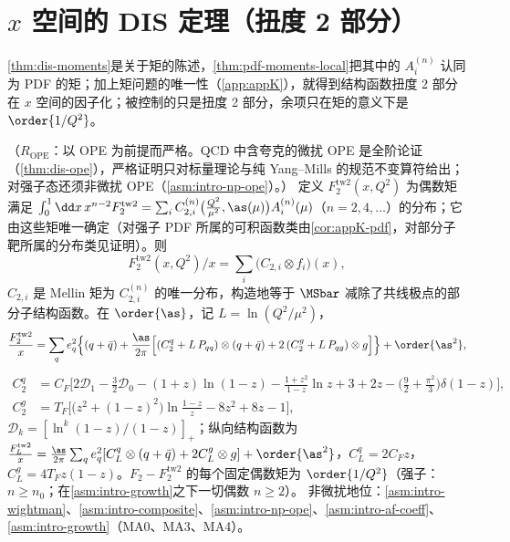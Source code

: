 \section{$x$ 空间的 DIS 定理（扭度 2 部分）}\label{sec:pdf-dis}

\cref{thm:dis-moments}是关于矩的陈述，\cref{thm:pdf-moments-local}把其中的 $A^{(n)}_i$ 认同为 PDF 的矩；加上矩问题的唯一性（\cref{app:appK}），就得到结构函数扭度 2 部分在 $x$ 空间的因子化；被控制的只是扭度 2 部分，余项只在矩的意义下是 $\order{1/Q^2}$。

\begin{theorem}\label{thm:pdf-dis-xspace}
（$R_{\mathrm{OPE}}$：以 OPE 为前提而严格。QCD 中含夸克的微扰 OPE 是全阶论证（\cref{thm:dis-ope}），严格证明只对标量理论与纯 Yang--Mills 的规范不变算符给出；对强子态还须非微扰 OPE（\cref{asm:intro-np-ope}）。）
定义 $F_2^{\mathrm{tw2}}(x,Q^2)$ 为偶数矩满足 $\int_0^1\dd x\,x^{n-2}F_2^{\mathrm{tw2}}=\sum_iC^{(n)}_{2,i}\big(\frac{Q^2}{\mu^2},\as(\mu)\big)A^{(n)}_i(\mu)$（$n=2,4,\dots$）的分布；它由这些矩唯一确定（对强子 PDF 所属的可积函数类由\cref{cor:appK-pdf}，对部分子靶所属的分布类见证明）。则
\begin{equation}\label{eq:pdf-xspace}
F_2^{\mathrm{tw2}}(x,Q^2)/x=\textstyle\sum_i\big(C_{2,i}\otimes f_i\big)(x),
\end{equation}
$C_{2,i}$ 是 Mellin 矩为 $C^{(n)}_{2,i}$ 的唯一分布，构造地等于 $\MSbar$ 减除了共线极点的部分子结构函数。在 $\order{\as}$，记 $L=\ln(Q^2/\mu^2)$，
\begin{equation}\label{eq:pdf-F2nlo}
\frac{F_2^{\mathrm{tw2}}}{x}=\sum_qe_q^2\Big\{(q+\bar q)+\frac{\as}{2\pi}\Big[(C_2^q+L\,P_{qq})\otimes(q+\bar q)+2\,(C_2^g+L\,P_{qg})\otimes g\Big]\Big\}+\order{\as^2},
\end{equation}
\begin{equation}\label{eq:pdf-C2}
\begin{aligned}
C_2^q&=C_F\Big[2\mathcal D_1-\tfrac32\mathcal D_0-(1+z)\ln(1-z)-\tfrac{1+z^2}{1-z}\ln z+3+2z-\big(\tfrac92+\tfrac{\pi^2}3\big)\delta(1-z)\Big],\\
C_2^g&=T_F\Big[\big(z^2+(1-z)^2\big)\ln\tfrac{1-z}{z}-8z^2+8z-1\Big],
\end{aligned}
\end{equation}
$\mathcal D_k=[\ln^k(1-z)/(1-z)]_+$；纵向结构函数为 $\frac{F_L^{\mathrm{tw2}}}{x}=\frac{\as}{2\pi}\sum_qe_q^2[C_L^q\otimes(q+\bar q)+2C_L^g\otimes g]+\order{\as^2}$，$C_L^q=2C_Fz$，$C_L^g=4T_Fz(1-z)$。$F_2-F_2^{\mathrm{tw2}}$ 的每个固定偶数矩为 $\order{1/Q^2}$（强子：$n\ge n_0$；在\cref{asm:intro-growth}之下一切偶数 $n\ge2$）。
非微扰地位：\cref{asm:intro-wightman}、\cref{asm:intro-composite}、\cref{asm:intro-np-ope}、\cref{asm:intro-af-coeff}、\cref{asm:intro-growth}（MA0、MA3、MA4）。
\end{theorem}

